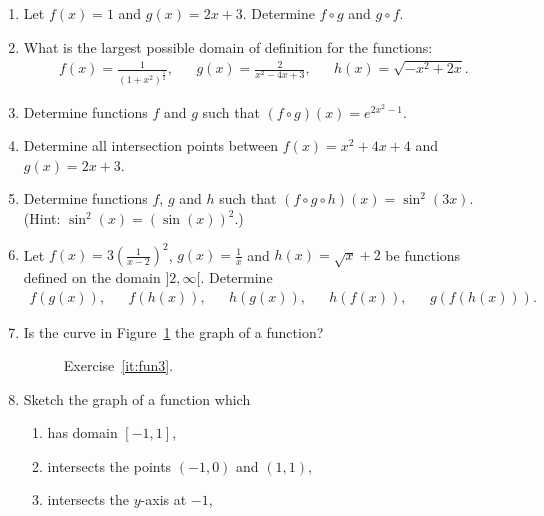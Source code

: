\begin{enumerate}
	\item Let $f(x)=1$ and $g(x)=2x+3$. Determine $f\circ g$ and $g\circ f$.
	
	
	\item What is the largest possible domain of definition for the functions:
	\begin{align*}
	f(x)=\frac{1}{(1+x^2)^\frac{1}{2}},&& g(x)=\frac{2}{x^2-4x+3},&& h(x)=\sqrt{-x^2+2x}.
	\end{align*}
	
	
	\item Determine functions $f$ and $g$ such that $(f\circ g)(x)=e^{2x^2-1}$.
	
	\item Determine all intersection points between $f(x)=x^2+4x+4$ and $g(x)=2x+3$.
	
	\item Determine functions $f$, $g$ and $h$ such that $(f\circ g\circ h)(x)=\sin^2(3x)$. (Hint: $ \sin^2(x)=(\sin(x))^2 $.)
	
	\item Let $f(x)=3(\frac{1}{x-2})^2$, $g(x)=\frac{1}{x}$ and $h(x)=\sqrt{x}+2$ be functions defined on the domain $]2,\infty[$. Determine
	\begin{align*}
	f(g(x)),&& f(h(x)),&& h(g(x)),&& h(f(x)),&&g(f(h(x))).
	\end{align*} 
	
		\item\label{it:fun3} Is the curve in Figure~\ref{fig:fun3} the graph of a function?
	\begin{figure}
		\centering
		\caption{Exercise~\ref{it:fun3}.}
		\label{fig:fun3}
	\end{figure}

	\item Sketch the graph of a function which
	\begin{enumerate}
	\item has domain $[-1,1]$,
	\item intersects the points $(-1,0)$ and $(1,1)$,
	\item intersects the $y$-axis at $-1$,
	\end{enumerate}
	
\end{enumerate}